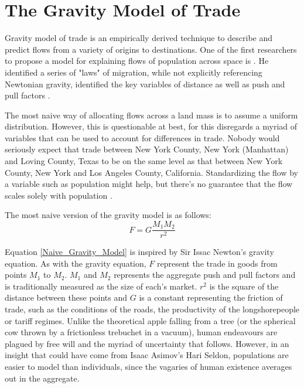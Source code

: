 \section{The Gravity Model of Trade}


Gravity model of trade is an empirically derived technique to describe and predict flows from a variety of origins to destinations.  One of the first researchers to propose a model for explaining flows of population across space is  \cite{ravenstein1885laws}. He identified a series of "laws" of migration, while not explicitly referencing Newtonian gravity, identified the key variables of distance as well as push and pull factors \citep{Tobler1995}.  

The most naive way of allocating flows across a land mass is to assume a uniform distribution.  However, this is questionable at best, for this disregards a myriad of variables that can be used to account for differences in trade.  Nobody would seriously expect that trade between New York County, New York (Manhattan) and Loving County, Texas to be on the same level as that between New York County, New York and Los Angeles County, California.  Standardizing the flow by a variable such as population might help, but there's no guarantee that the flow scales solely with population \citep{Crymble19}.   

The most naive version of the gravity model is as follows:
\begin{equation}
F = G \frac{M_{1}M_{2}}{r^{2}}
\label{Naive_Gravity_Model}
\end{equation}  

Equation \ref{Naive_Gravity_Model} is inspired by Sir Issac Newton's gravity equation.  As with the gravity equation, $F$ represent the trade in goods from points $M_{1}$ to $M_{2}$. $M_{1}$ and $M_{2}$ represents the aggregate push and pull factors and is traditionally measured as the size of each's market. $r^{2}$ is the square of the distance between these points and $G$ is a constant representing the friction of trade, such as the conditions of the roads, the productivity of the longshorepeople or tariff regimes.  Unlike the theoretical apple falling from a tree (or the spherical cow thrown by a frictionless trebuchet in a vacuum), human endeavours are plagued by free will and the myriad of uncertainty that follows.  However, in an insight that could have come from Isaac Asimov's Hari Seldon, populations are easier to model than individuals, since the vagaries of human existence averages out in the aggregate.  


